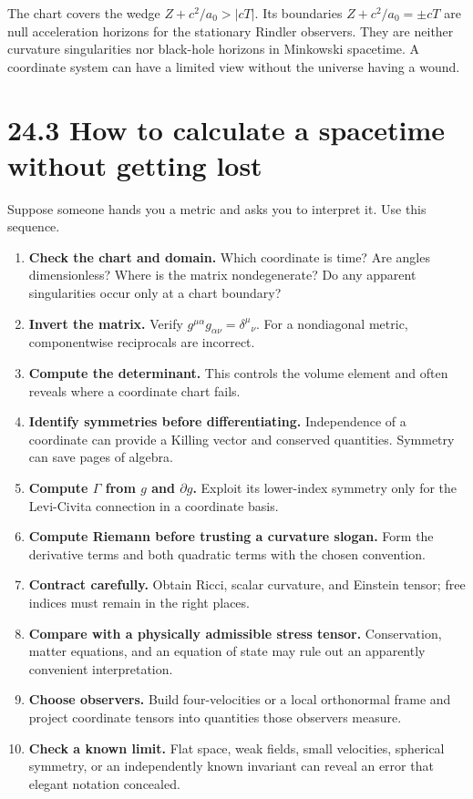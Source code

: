 \documentclass[
  11pt,
  letterpaper,
  oneside,
  openany]{scrbook}
\providecommand{\tightlist}{%
  \setlength{\itemsep}{0pt}\setlength{\parskip}{0pt}}
\begin{document}
The chart covers the wedge \(Z+c^2/a_0>|cT|\). Its boundaries
\(Z+c^2/a_0=\pm cT\) are null acceleration horizons for the stationary
Rindler observers. They are neither curvature singularities nor
black-hole horizons in Minkowski spacetime. A coordinate system can have
a limited view without the universe having a wound.

\hypertarget{how-to-calculate-a-spacetime-without-getting-lost}{%
\section{24.3 How to calculate a spacetime without getting
lost}\label{how-to-calculate-a-spacetime-without-getting-lost}}

Suppose someone hands you a metric and asks you to interpret it. Use
this sequence.

\begin{enumerate}
\def\labelenumi{\arabic{enumi}.}
\tightlist
\item
  \textbf{Check the chart and domain.} Which coordinate is time? Are
  angles dimensionless? Where is the matrix nondegenerate? Do any
  apparent singularities occur only at a chart boundary?
\item
  \textbf{Invert the matrix.} Verify
  \(g^{\mu\alpha}g_{\alpha\nu}=\delta^\mu{}_{\nu}\). For a nondiagonal
  metric, componentwise reciprocals are incorrect.
\item
  \textbf{Compute the determinant.} This controls the volume element and
  often reveals where a coordinate chart fails.
\item
  \textbf{Identify symmetries before differentiating.} Independence of a
  coordinate can provide a Killing vector and conserved quantities.
  Symmetry can save pages of algebra.
\item
  \textbf{Compute \(\Gamma\) from \(g\) and \(\partial g\).} Exploit its
  lower-index symmetry only for the Levi-Civita connection in a
  coordinate basis.
\item
  \textbf{Compute Riemann before trusting a curvature slogan.} Form the
  derivative terms and both quadratic terms with the chosen convention.
\item
  \textbf{Contract carefully.} Obtain Ricci, scalar curvature, and
  Einstein tensor; free indices must remain in the right places.
\item
  \textbf{Compare with a physically admissible stress tensor.}
  Conservation, matter equations, and an equation of state may rule out
  an apparently convenient interpretation.
\item
  \textbf{Choose observers.} Build four-velocities or a local
  orthonormal frame and project coordinate tensors into quantities those
  observers measure.
\item
  \textbf{Check a known limit.} Flat space, weak fields, small
  velocities, spherical symmetry, or an independently known invariant
  can reveal an error that elegant notation concealed.
\end{enumerate}
\end{document}
